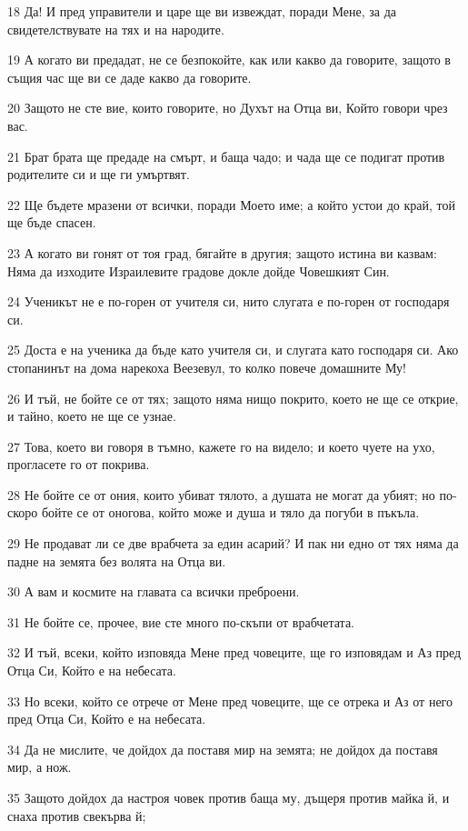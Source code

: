 \par 18 Да! И пред управители и царе ще ви извеждат, поради Мене, за да свидетелствувате на тях и на народите.
\par 19 А когато ви предадат, не се безпокойте, как или какво да говорите, защото в същия час ще ви се даде какво да говорите.
\par 20 Защото не сте вие, които говорите, но Духът на Отца ви, Който говори чрез вас.
\par 21 Брат брата ще предаде на смърт, и баща чадо; и чада ще се подигат против родителите си и ще ги умъртвят.
\par 22 Ще бъдете мразени от всички, поради Моето име; а който устои до край, той ще бъде спасен.
\par 23 А когато ви гонят от тоя град, бягайте в другия; защото истина ви казвам: Няма да изходите Израилевите градове докле дойде Човешкият Син.
\par 24 Ученикът не е по-горен от учителя си, нито слугата е по-горен от господаря си.
\par 25 Доста е на ученика да бъде като учителя си, и слугата като господаря си. Ако стопанинът на дома нарекоха Веезевул, то колко повече домашните Му!
\par 26 И тъй, не бойте се от тях; защото няма нищо покрито, което не ще се открие, и тайно, което не ще се узнае.
\par 27 Това, което ви говоря в тъмно, кажете го на видело; и което чуете на ухо, прогласете го от покрива.
\par 28 Не бойте се от ония, които убиват тялото, а душата не могат да убият; но по-скоро бойте се от оногова, който може и душа и тяло да погуби в пъкъла.
\par 29 Не продават ли се две врабчета за един асарий? И пак ни едно от тях няма да падне на земята без волята на Отца ви.
\par 30 А вам и космите на главата са всички преброени.
\par 31 Не бойте се, прочее, вие сте много по-скъпи от врабчетата.
\par 32 И тъй, всеки, който изповяда Мене пред човеците, ще го изповядам и Аз пред Отца Си, Който е на небесата.
\par 33 Но всеки, който се отрече от Мене пред човеците, ще се отрека и Аз от него пред Отца Си, Който е на небесата.
\par 34 Да не мислите, че дойдох да поставя мир на земята; не дойдох да поставя мир, а нож.
\par 35 Защото дойдох да настроя човек против баща му, дъщеря против майка й, и снаха против свекърва й;
